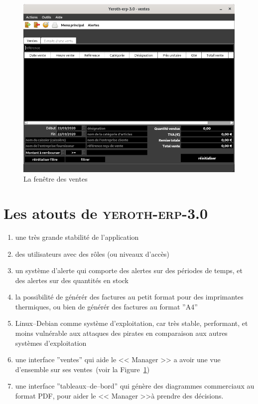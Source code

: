 \documentclass[a4paper, 10pt, twocolumn]{article}
\newcommand{\yeren}{\textsc{yeroth-erp-3.0}\xspace}
\newcommand{\manager}{<< Manager >>\xspace}
\begin{document}
\begin{figure}[!htbp]
\centering
\includegraphics[scale=0.32]{../images/yeren-fenetre-caisse.png}
\caption{La fen\^etre des ventes}
\label{fig:fenetre-de-la-vente}
\end{figure}

\vspace{-1.9em}
\section{Les atouts de \yeren}
\vspace{-0.3em}
\begin{enumerate}[1)]
	\itemsep -0.3em
	\item une tr\`es grande stabilit\'e de l'application
	\item des utilisateurs avec des r\^oles (ou niveaux
	  d'acc\`es)
	\item un syst\`eme d'alerte qui comporte des alertes
	      sur des p\'eriodes de temps, et des alertes sur des
	      quantit\'es en stock
	\item la possibilit\'e de g\'en\'er\'er des factures au
	      petit format pour des imprimantes thermiques, ou bien
	      de g\'en\'er\'er des factures au format ''A4''
	\item Linux--Debian comme syst\`eme d'exploitation, car
	      tr\`es stable, performant, et moins vuln\'erable
	      aux attaques des pirates en comparaison aux autres
	      syst\`emes d'exploitation
	\item une interface ''ventes'' qui aide le \manager a
	      avoir une vue d'ensemble sur ses 
	      ventes~(voir la Figure~\ref{fig:fenetre-de-la-vente})
	\item une interface ''tableaux--de--bord'' qui
		  g\'en\`ere des diagrammes commerciaux au format PDF,
		  pour aider le \manager \`a prendre des d\'ecisions.
\end{enumerate}
\end{document}
